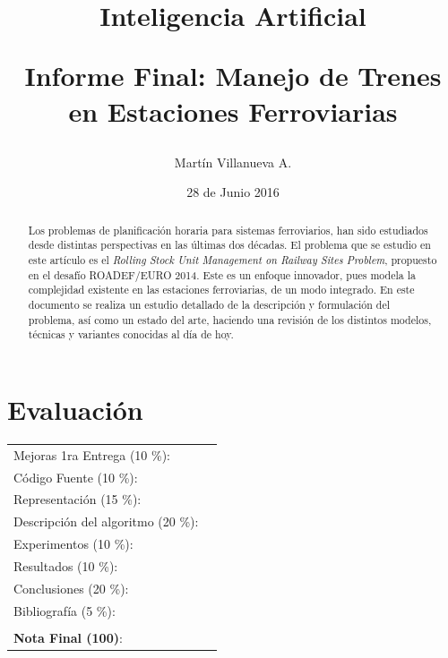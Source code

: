 \documentclass[letter, 10pt]{article}
\begin{document}
\title{Inteligencia Artificial \\ \begin{Large}Informe Final: Manejo de Trenes en Estaciones Ferroviarias\end{Large}}
\author{Martín Villanueva A.}
\date{28 de Junio 2016}
\maketitle


\section*{Evaluaci\'on}

\begin{tabular}{ll}
Mejoras 1ra Entrega (10 \%): &  \underline{\hspace{2cm}}\\
C\'odigo Fuente (10 \%): &  \underline{\hspace{2cm}}\\
Representaci\'on (15 \%):  & \underline{\hspace{2cm}} \\
Descripci\'on del algoritmo (20 \%):  & \underline{\hspace{2cm}} \\
Experimentos (10 \%):  & \underline{\hspace{2cm}} \\
Resultados (10 \%):  & \underline{\hspace{2cm}} \\
Conclusiones (20 \%): &  \underline{\hspace{2cm}}\\
Bibliograf\'ia (5 \%): & \underline{\hspace{2cm}}\\
 &  \\
\textbf{Nota Final (100)}:   & \underline{\hspace{2cm}}
\end{tabular}


\vspace{2cm}


\begin{abstract}
Los problemas de planificación horaria para sistemas ferroviarios, han sido estudiados desde distintas perspectivas en las últimas dos décadas. El problema que se estudio en este artículo es el \textit{Rolling Stock Unit Management on Railway Sites Problem}, propuesto en el desafío ROADEF/EURO 2014. Este es un enfoque innovador, pues modela la complejidad existente en las estaciones ferroviarias, de un modo integrado. En este documento se realiza un estudio detallado de la descripción y formulación del problema, así como un estado del arte, haciendo una revisión de los distintos modelos, técnicas y variantes conocidas al día de hoy.
\end{abstract}
\end{document}
